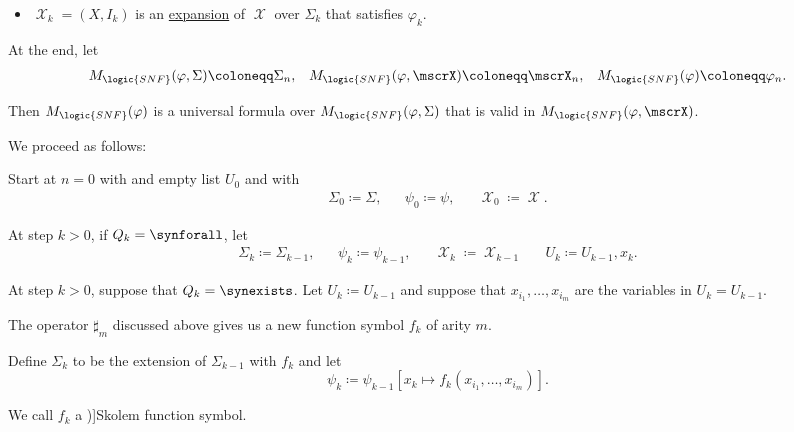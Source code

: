 \begin{algorithm}[Skolemization]
\begin{itemize}
    \item \( \mscrX_k = (X, I_k) \) is an \hyperref[def:fol_structure_expansion]{expansion} of \( \mscrX \) over \( \Sigma_k \) that satisfies \( \varphi_k \).
  \end{itemize}

  At the end, let
  \begin{align*}
    M_{\logic{SNF}}(\varphi, \Sigma) \coloneqq \Sigma_n,
    &&
    M_{\logic{SNF}}(\varphi, \mscrX) \coloneqq \mscrX_n,
    &&
    M_{\logic{SNF}}(\varphi) \coloneqq \varphi_n.
  \end{align*}

  Then \( M_{\logic{SNF}}(\varphi) \) is a universal formula over \( M_{\logic{SNF}}(\varphi, \Sigma) \) that is valid in \( M_{\logic{SNF}}(\varphi, \mscrX) \).

  We proceed as follows:
  \begin{thmenum}
     Start at \( n = 0 \) with and empty list \( U_0 \) and with
    \begin{align*}
      \Sigma_0 \coloneqq \Sigma,
      &&
      \psi_0 \coloneqq \psi,
      &&
      \mscrX_0 \coloneqq \mscrX.
    \end{align*}

     At step \( k > 0 \), if \( Q_k = \synforall \), let
    \begin{align*}
      \Sigma_k \coloneqq \Sigma_{k-1},
      &&
      \psi_k \coloneqq \psi_{k-1},
      &&
      \mscrX_k \coloneqq \mscrX_{k-1}
      &&
      U_k \coloneqq U_{k-1}, x_k.
    \end{align*}

     At step \( k > 0 \), suppose that \( Q_k = \synexists \). Let \( U_k \coloneqq U_{k-1} \) and suppose that \( x_{i_1}, \ldots, x_{i_m} \) are the variables in \( U_k = U_{k-1} \).

    The operator \( \sharp_m \) discussed above gives us a new function symbol \( f_k \) of arity \( m \).

    Define \( \Sigma_k \) to be the extension of \( \Sigma_{k-1} \) with \( f_k \) and let
    \begin{equation*}
      \psi_k \coloneqq \psi_{k-1}[x_k \mapsto f_k(x_{i_1}, \ldots, x_{i_m})].
    \end{equation*}

    We call \( f_k \) a \term[en=Skolem function (\cite[def. 3.4.2]{VanDalen2004LogicAndStructure})]{Skolem function symbol}.


\end{thmenum}
\end{algorithm}
